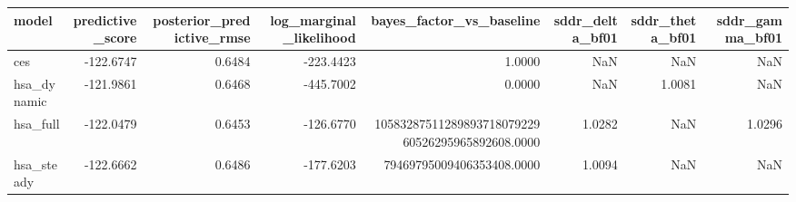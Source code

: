 \begin{tabular}{lrrrrrrr}
\toprule
model & predictive\_score & posterior\_predictive\_rmse & log\_marginal\_likelihood & bayes\_factor\_vs\_baseline & sddr\_delta\_bf01 & sddr\_theta\_bf01 & sddr\_gamma\_bf01 \\
\midrule
ces & -122.6747 & 0.6484 & -223.4423 & 1.0000 & NaN & NaN & NaN \\
hsa\_dynamic & -121.9861 & 0.6468 & -445.7002 & 0.0000 & NaN & 1.0081 & NaN \\
hsa\_full & -122.0479 & 0.6453 & -126.6770 & 1058328751128989371807922960526295965892608.0000 & 1.0282 & NaN & 1.0296 \\
hsa\_steady & -122.6662 & 0.6486 & -177.6203 & 79469795009406353408.0000 & 1.0094 & NaN & NaN \\
\bottomrule
\end{tabular}
